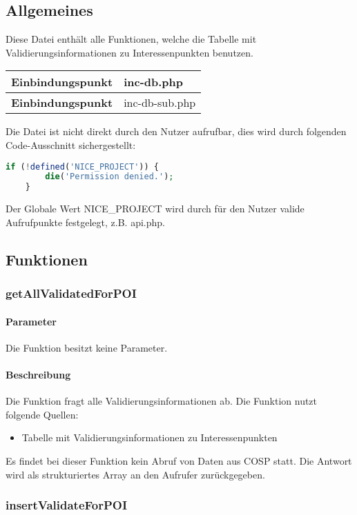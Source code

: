 \subsection{Allgemeines} Diese Datei enthält alle Funktionen, welche die Tabelle mit Validierungsinformationen zu Interessenpunkten benutzen.
\begin{table}[H]
	\begin{tabular}{|c|p{11cm}|}
		\hline
		\textbf{Einbindungspunkt} & inc-db.php \\ \hline
		\textbf{Einbindungspunkt} & inc-db-sub.php \\ \hline
	\end{tabular}
\end{table}
Die Datei ist nicht direkt durch den Nutzer aufrufbar, dies wird durch folgenden Code-Ausschnitt sichergestellt:
\begin{lstlisting}[language=php]
	if (!defined('NICE_PROJECT')) {
		die('Permission denied.');
	}
\end{lstlisting}
Der Globale Wert {\glqq NICE\_PROJECT\grqq} wird durch für den Nutzer valide Aufrufpunkte festgelegt, z.B. {\glqq api.php\grqq}.
\newpage
\subsection{Funktionen}
\subsubsection{getAllValidatedForPOI}
\paragraph{Parameter} Die Funktion besitzt keine Parameter.
\paragraph{Beschreibung} Die Funktion fragt alle Validierungsinformationen ab. Die Funktion nutzt folgende Quellen:
\begin{itemize}
	\item Tabelle mit Validierungsinformationen zu Interessenpunkten
\end{itemize}
Es findet bei dieser Funktion kein Abruf von Daten aus {\glqq COSP\grqq} statt. Die Antwort wird als strukturiertes Array an den Aufrufer zurückgegeben.
\subsubsection{insertValidateForPOI}
